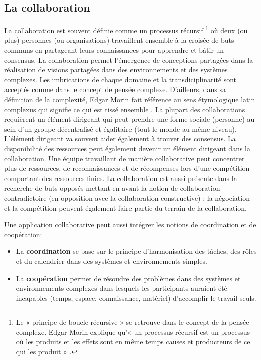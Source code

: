 


\subsection{La collaboration}
La collaboration  est souvent 
définie comme un processus récursif
\footnote{Le « principe de boucle 
	récursive » se retrouve dans le concept de la pensée complexe. Edgar Morin  
	explique qu'« un processus récursif est un processus où les produits et les 
	effets 
	sont en même temps causes et producteurs de ce qui les produit » 
	\cite[p. 100]{Morin1990}.} où deux (ou plus) personnes (ou organisations) 
travaillent ensemble à la croisée de buts communs 
en partageant leurs connaissances pour apprendre et bâtir un consensus. 
La collaboration permet l'émergence de conceptions partagées dans la réalisation 
de visions partagées dans des environnements et des systèmes complexes. 
Les imbrications de chaque domaine et la transdiciplinarité sont acceptés comme 
dans le concept de pensée complexe. D'ailleurs, dans sa définition de la 
complexité, Edgar Morin fait référence au sens étymologique latin \og 
complexus\fg{} qui signifie \og ce qui est tissé ensemble\fg{} \cite{Morin1990a}.
La plupart des collaborations requièrent un élément dirigeant qui peut prendre une 
forme sociale (personne) au sein d'un groupe décentralisé et égalitaire (tout le 
monde au même niveau). L'élément dirigeant va souvent aider également à trouver 
des consensus. 
La disponibilité des ressources peut également devenir un élément dirigeant dans 
la collaboration.
Une équipe travaillant de manière collaborative peut concentrer plus de 
ressources, de reconnaissances et de récompenses lors d'une 
compétition comportant des ressources finies. 
La collaboration est aussi présente dans la recherche de buts opposés mettant en 
avant la notion de collaboration contradictoire (en opposition avec la collaboration 
constructive) ; la négociation et la compétition peuvent également faire partie du 
terrain 
de la collaboration.

Une application collaborative peut aussi intégrer les notions de coordination et de 
coopération:
\begin{itemize}
	\item La \textbf{coordination} se base sur le principe d'harmonisation des 
	tâches, des rôles et du calendrier dans des systèmes et environnements 
	simples.
	\item La \textbf{coopération} permet de résoudre des problèmes dans des 
	systèmes et environnements complexes dans lesquels les participants auraient été 
	incapables (temps, espace, connaissance, matériel) d'accomplir le travail seuls.
\end{itemize}

